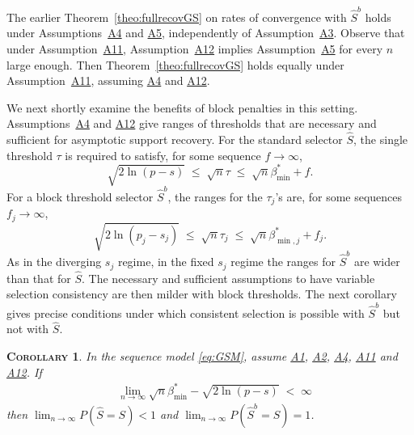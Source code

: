 \documentclass[bj,authoryear]{imsart}
\theoremstyle{plain}
\newtheorem{cor}[thm]{\textsc{Corollary}}
\begin{document}
The earlier Theorem~\ref{theo:fullrecovGS} on rates of convergence with $\hat S^b$ holds under Assumptions~\hyperlink{lab:A4}{A4} and \hyperlink{lab:A5}{A5}, independently of Assumption~\hyperlink{lab:A3}{A3}. Observe that under Assumption~\hyperlink{lab:A11}{A11}, Assumption~\hyperlink{lab:A12}{A12} implies Assumption~\hyperlink{lab:A5}{A5} for every $n$ large enough. Then Theorem~\ref{theo:fullrecovGS} holds equally under Assumption~\hyperlink{lab:A11}{A11}, assuming  \hyperlink{lab:A4}{A4} and \hyperlink{lab:A12}{A12}.

We next shortly examine the benefits of block penalties in this setting. Assumptions~\hyperlink{lab:A4}{A4} and \hyperlink{lab:A12}{A12} give ranges of thresholds that are necessary and sufficient for asymptotic support recovery. For the standard selector $\hat S$, the single threshold $\tau$ is required to satisfy, for some
sequence $f\to \infty$,
\begin{equation*}
    \sqrt{2\ln(p-s)} \;\leq \;\sqrt{n}\tau\; \leq\; \sqrt{n}\beta_{\min}^* + f.
\end{equation*}
For a block threshold selector $\hat S^b$, the ranges for the $\tau_j$'s are, for some sequences $f_j\to \infty$,
\begin{equation*}
  \sqrt{2\ln(p_j-s_j)} \;\leq\; \sqrt{n}\tau_j \;\leq\; \sqrt{n}\beta_{\min,j}^* + f_j.
\end{equation*}
As in the diverging $s_j$ regime, in the fixed $s_j$ regime the ranges for $\hat S^b$ are wider than that for $\hat S$. The necessary and sufficient assumptions to have variable selection consistency are then milder with block thresholds. The next corollary gives precise conditions under which consistent selection is possible with $\hat S^b$ but not with $\hat S$.
\begin{cor}\label{cor:sfin}
 In the sequence model \eqref{eq:GSM}, assume \hyperlink{lab:A1}{A1}, \hyperlink{lab:A2}{A2}, \hyperlink{lab:A4}{A4}, \hyperlink{lab:A11}{A11} and \hyperlink{lab:A12}{A12}.  If
\begin{eqnarray*}
&\lim_{n\to\infty}\sqrt{n}\beta_{\min}^*-\sqrt{2\ln(p-s)} \;<\;\infty
\end{eqnarray*}
then 
$\lim_{n\to\infty}P(\hat{S} = S)< 1$ and $\lim_{n\to\infty}P(\hat{S}^{b} = S)= 1$.  
\end{cor}
\end{document}
